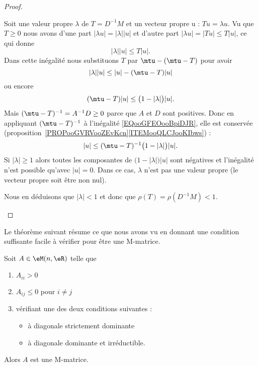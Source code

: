 \begin{proof}
\begin{subproof}
		Soit une valeur propre \( \lambda\) de \( T=D^{-1}M\) et un vecteur propre u : \( Tu=\lambda u\). Vu que \( T\geq 0\) nous avons d'une part \( | \lambda u |=| \lambda| | u |\) et d'autre part \( | \lambda u |=| Tu |\leq T| u |\), ce qui donne
		\begin{equation}
			| \lambda | |u |\leq T| u |.
		\end{equation}
		Dans cette inégalité nous substituons \( T\) par \( \mtu-(\mtu-T)\) pour avoir
		\begin{equation}
			| \lambda | |u |\leq | u |-(\mtu-T)| u |
		\end{equation}
		ou encore
		\begin{equation}        \label{EQooGFEOooBpiDJR}
			(\mtu-T)| u |\leq \big( 1-| \lambda | \big)| u |.
		\end{equation}
		Mais \( (\mtu-T)^{-1}=A^{-1}D\geq 0\) parce que \( A\) et \( D\) sont positives. Donc en appliquant \( (\mtu-T)^{-1}\) à l'inégalité \eqref{EQooGFEOooBpiDJR}, elle est conservée (proposition~\ref{PROPooGVRVooZEvKcn}\ref{ITEMooQLCJooKIbws}) :
		\begin{equation}
			| u |\leq (\mtu-T)^{-1}\big( 1-| \lambda | \big)| u |.
		\end{equation}
		Si \( | \lambda |\geq 1\) alors toutes les composantes de \( \big( 1-| \lambda | \big)| u |\) sont négatives et l'inégalité n'est possible qu'avec \( | u |=0\). Dans ce cas, \( \lambda\) n'est pas une valeur propre (le vecteur propre soit être non nul).

		Nous en déduisons que \( | \lambda |<1\) et donc que \( \rho(T)=\rho(D^{-1}M)<1\).
	\end{subproof}
\end{proof}

Le théorème suivant résume ce que nous avons vu en donnant une condition suffisante facile à vérifier pour être une M-matrice.
\begin{theorem}     \label{THOooLZGSooSevggj}
	Soit \( A\in \eM(n,\eR)\) telle que
	\begin{enumerate}
		\item
		      \( A_{ii}>0\)
		\item
		      \( A_{ij}\leq 0\) pour \( i\neq j\)
		\item
		      vérifiant une des deux conditions suivantes :
		      \begin{itemize}
			      \item à diagonale strictement dominante
			      \item à diagonale dominante et irréductible.
		      \end{itemize}
	\end{enumerate}
	Alors \( A\) est une M-matrice.
\end{theorem}

